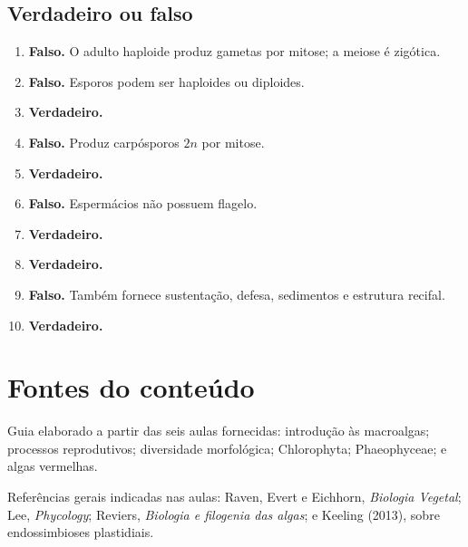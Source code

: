 \documentclass[12pt,a4paper]{article}
\newcommand{\dn}{\ensuremath{2n}}
\begin{document}
\subsection{Verdadeiro ou falso}
\begin{enumerate}
\item \textbf{Falso.} O adulto haploide produz gametas por mitose; a meiose é
zigótica.
\item \textbf{Falso.} Esporos podem ser haploides ou diploides.
\item \textbf{Verdadeiro.}
\item \textbf{Falso.} Produz carpósporos \dn{} por mitose.
\item \textbf{Verdadeiro.}
\item \textbf{Falso.} Espermácios não possuem flagelo.
\item \textbf{Verdadeiro.}
\item \textbf{Verdadeiro.}
\item \textbf{Falso.} Também fornece sustentação, defesa, sedimentos e
estrutura recifal.
\item \textbf{Verdadeiro.}
\end{enumerate}

\section*{Fontes do conteúdo}
Guia elaborado a partir das seis aulas fornecidas: introdução às macroalgas;
processos reprodutivos; diversidade morfológica; Chlorophyta; Phaeophyceae; e
algas vermelhas.

Referências gerais indicadas nas aulas: Raven, Evert e Eichhorn,
\textit{Biologia Vegetal}; Lee, \textit{Phycology}; Reviers,
\textit{Biologia e filogenia das algas}; e Keeling (2013), sobre endossimbioses
plastidiais.
\end{document}
